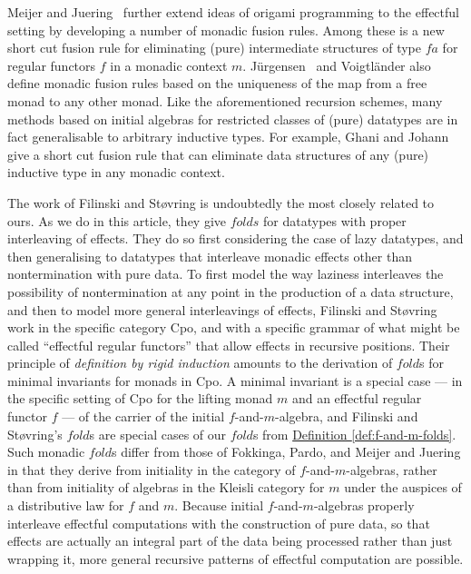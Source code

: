 \documentclass{jfp1}
\newcommand{\defref}[1]{\hyperref[#1]{Definition \ref*{#1}}}
\begin{document}
Meijer and Juering~\cite{mj95} further extend ideas of origami
programming to the effectful setting by developing a number of monadic
fusion rules. Among these is a new short cut fusion rule for
eliminating (pure) intermediate structures of type $fa$ for regular
functors $f$ in a monadic context $m$.  J\"urgensen~\cite{jue02} and
Voigtl\"ander \cite{voi08} also define monadic fusion rules based on
the uniqueness of the map from a free monad to any other monad.  Like
the aforementioned recursion schemes, many methods based on initial
algebras for restricted classes of (pure) datatypes are in fact
generalisable to arbitrary inductive types. For example, Ghani and
Johann~\cite{gj09} give a short cut fusion rule that can eliminate
data structures of any (pure) inductive type in any monadic context.

The work of Filinski and St\o{}vring \cite{filinski07inductive} is
undoubtedly the most closely related to ours. As we do in this
article, they give $\mathit{fold}s$ for datatypes with proper
interleaving of effects. They do so first considering the case of lazy
datatypes, and then generalising to datatypes that interleave monadic
effects other than nontermination with pure data. To first model the
way laziness interleaves the possibility of nontermination at any
point in the production of a data structure, and then to model more
general interleavings of effects, Filinski and St\o{}vring work in the
specific category Cpo, and 
with a specific grammar of what might be called ``effectful regular
functors'' that allow effects in recursive positions. Their principle
of {\em definition by rigid induction} amounts to the derivation of
$\mathit{fold}$s for minimal invariants for monads in Cpo. A minimal
invariant is a special case --- in the specific setting of Cpo for the
lifting monad $m$ and an effectful regular functor $f$ --- of the
carrier of the initial $f$-and-$m$-algebra, and Filinski and
St\o{}vring's $\mathit{fold}$s are special cases of our
$\mathit{fold}$s from \defref{def:f-and-m-folds}. Such monadic
$\mathit{fold}$s differ from those of Fokkinga, Pardo, and Meijer and
Juering in that they derive from initiality in the category of
$f$-and-$m$-algebras, rather than from initiality of algebras in the
Kleisli category for $m$ under the auspices of a distributive law for
$f$ and $m$.  Because initial $f$-and-$m$-algebras properly interleave
effectful computations with the construction of pure data, so that
effects are actually an integral part of the data being processed
rather than just wrapping it, more general recursive patterns of
effectful computation are possible.
\end{document}
